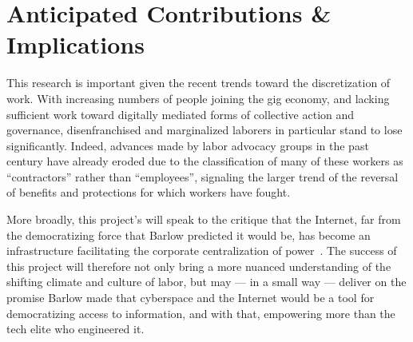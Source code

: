 \documentclass{article}
\begin{document}
\section*{Anticipated Contributions \& Implications}
This research is important given the recent trends toward the discretization of work.
With increasing numbers of people joining the gig economy,
and lacking sufficient work toward digitally mediated forms of collective action and governance,
disenfranchised and marginalized laborers in particular stand to lose significantly.
Indeed, advances made by labor advocacy groups in the past century have already eroded
due to the classification of many of these workers as ``contractors'' rather than ``employees'',
signaling the larger trend of the reversal of benefits and protections for which workers have fought.

More broadly, this project's will speak to the critique that the Internet,
far from the democratizing force that Barlow predicted it would be,
has become an infrastructure facilitating the corporate centralization of power~\cite{barlow2009declaration,jones2011does,EboCybertopia}.
The success of this project will therefore not only
bring a more nuanced understanding of the shifting climate and culture of labor,
but may
--- in a small way ---
deliver on the promise Barlow made that
cyberspace and the Internet would be a tool for democratizing access to information, and with that,
empowering more than the tech elite who engineered it.


\pagebreak
\printbibliography{}
% 
% 
\end{document}
